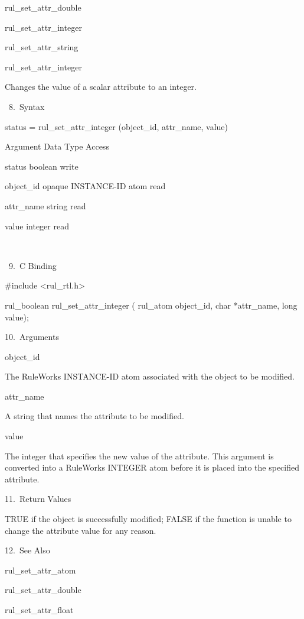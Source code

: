 {          rul_set_attr_double

          rul_set_attr_integer

          rul_set_attr_string

          rul_set_attr_integer

          Changes the value of a scalar
          attribute to an integer.

       8. Syntax

          status = rul_set_attr_integer
          (object_id, attr_name, value)

          Argument  Data Type     Access

          status  boolean     write

          object_id  opaque INSTANCE-ID atom
           read

          attr_name  string     read

          value  integer     read

           

       9. C Binding

          #include <rul_rtl.h>

          rul_boolean rul_set_attr_integer (
          rul_atom object_id,
          char *attr_name,
          long value);

      10. Arguments

          object_id

          The RuleWorks INSTANCE-ID atom
          associated with the object to be
          modified.

          attr_name

          A string that names the attribute to
          be modified.

          value

          The integer that specifies the new
          value of the attribute. This
          argument is converted into a
          RuleWorks INTEGER atom before it is
          placed into the specified attribute.

      11. Return Values

          TRUE if the object is successfully
          modified; FALSE if the function is
          unable to change the attribute value
          for any reason.

      12. See Also

    rul_set_attr_atom

    rul_set_attr_double

    rul_set_attr_float

}
